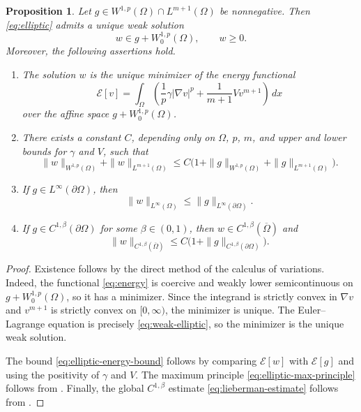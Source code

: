 \documentclass[a4paper,12pt]{article}
\newcommand{\pr}{\partial}
\newtheorem{prop}[thm]{Proposition}
\theoremstyle{definition}
\theoremstyle{remark}
\begin{document}
\begin{prop}\label{prop:elliptic-forward}
Let $g\in W^{1,p}(\Omega)\cap L^{m+1}(\Omega)$ be nonnegative. Then \eqref{eq:elliptic} admits a unique weak solution
\[
w\in g+W^{1,p}_0(\Omega),\qquad w\ge0.
\]
Moreover, the following assertions hold.
\begin{enumerate}
\item The solution $w$ is the unique minimizer of the energy functional
\begin{equation}\label{eq:energy}
\mathcal E[v]
=\int_\Omega\left(\frac{1}{p}\gamma|\nabla v|^p+\frac{1}{m+1}Vv^{m+1}\right)\,dx
\end{equation}
over the affine space $g+W^{1,p}_0(\Omega)$.
\item There exists a constant $C$, depending only on $\Omega$, $p$, $m$, and upper and lower bounds for $\gamma$ and $V$, such that
\begin{equation}\label{eq:elliptic-energy-bound}
\|w\|_{W^{1,p}(\Omega)}+\|w\|_{L^{m+1}(\Omega)}
\le C\bigl(1+\|g\|_{W^{1,p}(\Omega)}+\|g\|_{L^{m+1}(\Omega)}\bigr).
\end{equation}
\item If $g\in L^\infty(\pr\Omega)$, then
\begin{equation}\label{eq:elliptic-max-principle}
\|w\|_{L^\infty(\Omega)}\le \|g\|_{L^\infty(\pr\Omega)}.
\end{equation}
\item If $g\in C^{1,\beta}(\pr\Omega)$ for some $\beta\in(0,1)$, then $w\in C^{1,\beta}(\overline\Omega)$ and
\begin{equation}\label{eq:lieberman-estimate}
\|w\|_{C^{1,\beta}(\overline\Omega)}
\le C\bigl(1+\|g\|_{C^{1,\beta}(\pr\Omega)}\bigr).
\end{equation}
\end{enumerate}
\end{prop}

\begin{proof}
Existence follows by the direct method of the calculus of variations. Indeed, the functional \eqref{eq:energy} is coercive and weakly lower semicontinuous on $g+W^{1,p}_0(\Omega)$, so it has a minimizer. Since the integrand is strictly convex in $\nabla v$ and $v^{m+1}$ is strictly convex on $[0,\infty)$, the minimizer is unique. The Euler--Lagrange equation is precisely \eqref{eq:weak-elliptic}, so the minimizer is the unique weak solution.

The bound \eqref{eq:elliptic-energy-bound} follows by comparing $\mathcal E[w]$ with $\mathcal E[g]$ and using the positivity of $\gamma$ and $V$. The maximum principle \eqref{eq:elliptic-max-principle} follows from \cite[Theorem 2.1]{LeoPe}. Finally, the global $C^{1,\beta}$ estimate \eqref{eq:lieberman-estimate} follows from \cite[Theorem 1]{Lieberman1988}.
\end{proof}
\end{document}
